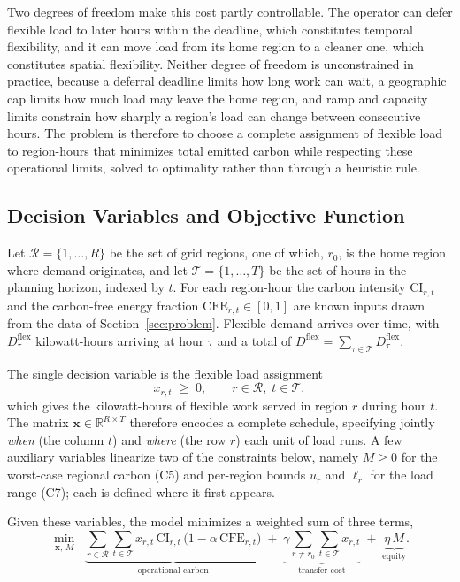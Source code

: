 Two degrees of freedom make this cost partly controllable. The operator can defer flexible load to later hours within the deadline, which constitutes temporal flexibility, and it can move load from its home region to a cleaner one, which constitutes spatial flexibility. Neither degree of freedom is unconstrained in practice, because a deferral deadline limits how long work can wait, a geographic cap limits how much load may leave the home region, and ramp and capacity limits constrain how sharply a region's load can change between consecutive hours. The problem is therefore to choose a complete assignment of flexible load to region-hours that minimizes total emitted carbon while respecting these operational limits, solved to optimality rather than through a heuristic rule.

\subsection{Decision Variables and Objective Function}
\label{sec:form-notation}

Let $\mathcal{R} = \{1, \dots, R\}$ be the set of grid regions, one of which, $r_0$, is the home region where demand originates, and let $\mathcal{T} = \{1, \dots, T\}$ be the set of hours in the planning horizon, indexed by $t$. For each region-hour the carbon intensity $\text{CI}_{r,t}$ and the carbon-free energy fraction $\text{CFE}_{r,t} \in [0,1]$ are known inputs drawn from the data of Section~\ref{sec:problem}. Flexible demand arrives over time, with $D^{\text{flex}}_{\tau}$ kilowatt-hours arriving at hour $\tau$ and a total of $D^{\text{flex}} = \sum_{\tau \in \mathcal{T}} D^{\text{flex}}_{\tau}$.

The single decision variable is the flexible load assignment
\begin{equation}
x_{r,t} \;\geq\; 0, \qquad r \in \mathcal{R}, \; t \in \mathcal{T},
\end{equation}
which gives the kilowatt-hours of flexible work served in region $r$ during hour $t$. The matrix $\mathbf{x} \in \mathbb{R}^{R \times T}$ therefore encodes a complete schedule, specifying jointly \emph{when} (the column $t$) and \emph{where} (the row $r$) each unit of load runs. A few auxiliary variables linearize two of the constraints below, namely $M \geq 0$ for the worst-case regional carbon (C5) and per-region bounds $u_r$ and $\ell_r$ for the load range (C7); each is defined where it first appears.

Given these variables, the model minimizes a weighted sum of three terms,
\begin{equation}
\min_{\mathbf{x},\, M} \;\;
\underbrace{\sum_{r \in \mathcal{R}} \sum_{t \in \mathcal{T}} x_{r,t}\, \text{CI}_{r,t}\,\bigl(1 - \alpha\,\text{CFE}_{r,t}\bigr)}_{\text{operational carbon}}
\;+\;
\underbrace{\gamma \sum_{r \neq r_0} \sum_{t \in \mathcal{T}} x_{r,t}}_{\text{transfer cost}}
\;+\;
\underbrace{\eta\, M}_{\text{equity}}.
\label{eq:objective}
\end{equation}

